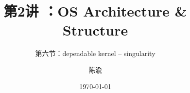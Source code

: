 


\title[第1讲]{第2讲 ：OS Architecture \& Structure} %
\subtitle{第六节：dependable kernel -- singularity }
\author{陈渝} %
\date{\today} %




\begin{frame}
\titlepage %
\end{frame}

%
%


